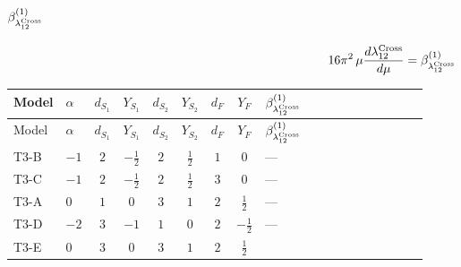 \documentclass{article}
\begin{document}
\begin{landscape}
\section*{$\beta_{\lambda_{12}^{\rm Cross}}^{(1)}$}
\[16\pi^2\,\mu\frac{d \lambda_{12}^{\rm Cross}}{d\mu}=\beta_{\lambda_{12}^{\rm Cross}}^{(1)}\]
\tiny
\begin{longtable}{@{}llcccccc >{\raggedright\arraybackslash}p{0.54\linewidth}@{}}
\toprule
Model & $\alpha$ & $d_{S_1}$ & $Y_{S_1}$ & $d_{S_2}$ & $Y_{S_2}$ & $d_F$ & $Y_F$ & $\beta_{\lambda_{12}^{\rm Cross}}^{(1)}$ \\
\midrule
\endfirsthead
\toprule
Model & $\alpha$ & $d_{S_1}$ & $Y_{S_1}$ & $d_{S_2}$ & $Y_{S_2}$ & $d_F$ & $Y_F$ & $\beta_{\lambda_{12}^{\rm Cross}}^{(1)}$ \\
\midrule
\endhead
T3-B & $-1$ & $2$ & $-\frac{1}{2}$ & $2$ & $\frac{1}{2}$ & $1$ & $0$ & --- \\
\midrule
T3-C & $-1$ & $2$ & $-\frac{1}{2}$ & $2$ & $\frac{1}{2}$ & $3$ & $0$ & --- \\
\midrule
T3-A & $0$ & $1$ & $0$ & $3$ & $1$ & $2$ & $\frac{1}{2}$ & --- \\
\midrule
T3-D & $-2$ & $3$ & $-1$ & $1$ & $0$ & $2$ & $-\frac{1}{2}$ & --- \\
\midrule
T3-E & $0$ & $3$ & $0$ & $3$ & $1$ & $2$ & $\frac{1}{2}$ & \scriptsize\adjustbox{max width=\linewidth}{$\begin{gathered} {\lambda_{12}} \left(\frac{1}{2} \operatorname{Tr}\!\left({y_1}\,\left({y_1}\right)^{\dagger}\right)+\frac{1}{2} \operatorname{Tr}\!\left({y_2}\,\left({y_2}\right)^{\dagger}\right)+8 {\lambda_{12}^{\rm Cross}}+{\lambda_{S_1}^{\rm Adj}}+{\lambda_{S_2}^{\rm Adj}}\right) \\ +{\lambda_{12}^{\rm Cross}} (2 \operatorname{Tr}\!\left({y_1}\,\left({y_1}\right)^{\dagger}\right)+2 \operatorname{Tr}\!\left({y_2}\,\left({y_2}\right)^{\dagger}\right)) \\ -\frac{7}{6} \operatorname{Tr}\!\left({y_1}\,\left({y_1}\right)^{\dagger}\,{y_2}\,\left({y_2}\right)^{\dagger}\right) \\ -\frac{1}{2} {\lambda_{T3}} \left({\lambda_{T3}}\right)^{*} \\ +\frac{33 {g_2}^4}{4} \\ +{g_2}^2 (-6 {\lambda_{12}}-24 {\lambda_{12}^{\rm Cross}}) \\ +{g_Y}^2 \left(-\frac{3 {\lambda_{12}}}{2}-6 {\lambda_{12}^{\rm Cross}}\right) \\ +{\lambda_{12}}^2 \\ +{\lambda_{S_1}} (2 {\lambda_{12}}+3 {\lambda_{12}^{\rm Cross}}) \\ +{\lambda_{S_2}} (2 {\lambda_{12}}+3 {\lambda_{12}^{\rm Cross}}) \\ +4 {\lambda_{12}^{\rm Adj}}^2 \\ +11 {\lambda_{12}^{\rm Cross}}^2 \\ -{\lambda_{12}^{\rm Cross}} {\lambda_{S_1}^{\rm Adj}} \\ -{\lambda_{12}^{\rm Cross}} {\lambda_{S_2}^{\rm Adj}} \\ +{\lambda_{H1}} {\lambda_{H2}}\end{gathered}$} \\

\end{longtable}
\end{landscape}
\end{document}
